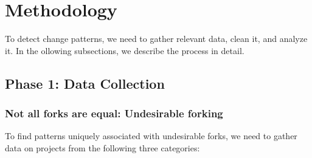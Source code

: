 \documentclass{acm_proc_article-sp}
\begin{document}
%
%
%



\section{Methodology}
\label{methodology}

To detect change patterns, we need to gather  relevant data, clean it, and analyze it. In the ollowing subsections, we describe the process in detail. 

\subsection{Phase 1: Data Collection}

\subsubsection{Not all forks are equal: Undesirable forking}
To find patterns uniquely associated with undesirable forks, we need to gather data on projects from the following three categories: 
\end{document}
